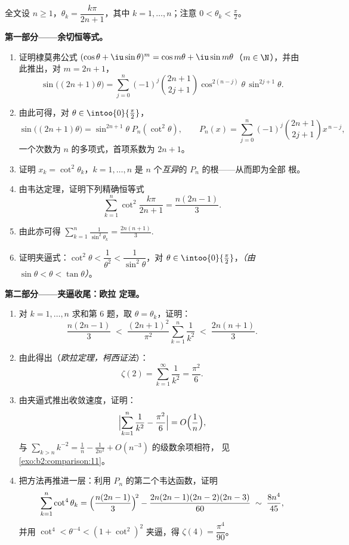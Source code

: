 \begin{problem}[{周末问题——$\zeta(2) = \pi^2/6$ 与
伯特兰全景}]
\label{pb:b2:series:1}
全文设 $n \geq 1$，$\theta_k = \dfrac{k\pi}{2n+1}$，其中 $k
= 1, \dots, n$；注意 $0 < \theta_k < \frac\pi2$。

\medskip
\noindent\textbf{第一部分——余切恒等式。}
\begin{enumerate}
  \item 证明棣莫弗公式 $(\cos\theta +
        \iu\sin\theta)^m = \cos m\theta + \iu\sin m\theta$（$m
        \in \N$），并由此推出，对 $m = 2n + 1$，
        \[
        \sin\bigl((2n{+}1)\theta\bigr) = \sum_{j=0}^{n}
        (-1)^j\binom{2n+1}{2j+1}\cos^{2(n-j)}\theta\,
        \sin^{2j+1}\theta .
        \]
  \item 由此可得，对 $\theta \in \intoo{0}{\frac\pi2}$，
        \[
        \sin\bigl((2n{+}1)\theta\bigr) =
        \sin^{2n+1}\theta\; P_n(\cot^2\theta),
        \qquad
        P_n(x) = \sum_{j=0}^{n}
        (-1)^j\binom{2n+1}{2j+1}x^{\,n-j},
        \]
        一个次数为 $n$ 的多项式，首项系数为 $2n
        + 1$。
  \item 证明 $x_k = \cot^2\theta_k$，$k = 1, \dots, n$ 是
        $n$ 个\emph{互异}的 $P_n$ 的根——从而即为全部
        根。
  \item 由韦达定理，证明下列精确恒等式
        \[
        \sum_{k=1}^{n} \cot^2\frac{k\pi}{2n+1}
        = \frac{n(2n-1)}{3}.
        \]
  \item 由此亦可得 $\displaystyle\sum_{k=1}^{n}
        \frac{1}{\sin^2\theta_k} = \frac{2n(n+1)}{3}$.
  \item 证明夹逼式：$\cot^2\theta < \dfrac1{\theta^2} <
        \dfrac{1}{\sin^2\theta}$，对 $\theta \in
        \intoo{0}{\frac\pi2}$，\emph{（由 $\sin\theta < \theta <
        \tan\theta$）}。
\end{enumerate}

\medskip
\noindent\textbf{第二部分——夹逼收尾：欧拉
定理。}
\begin{enumerate}[resume]
  \item 对 $k = 1, \dots, n$ 求和第 6 题，取 $\theta =
        \theta_k$，证明：
        \[
        \frac{n(2n-1)}{3} \;<\;
        \frac{(2n+1)^2}{\pi^2}\sum_{k=1}^{n}\frac1{k^2}
        \;<\; \frac{2n(n+1)}{3}.
        \]
  \item 由此得出（\emph{欧拉定理，柯西证法}）：
        \[
        \zeta(2) = \sum_{k=1}^{\infty}\frac{1}{k^2} =
        \frac{\pi^2}{6}.
        \]
  \item 由夹逼式推出收敛速度，证明：
        \[
        \Bigl|\sum_{k=1}^{n}\frac1{k^2} - \frac{\pi^2}6\Bigr|
        = O\Bigl(\frac1n\Bigr),
        \]
        与 $\sum_{k>n}k^{-2} =
        \frac1n - \frac{1}{2n^2} + O(n^{-3})$ 的级数余项相符，
        见\cref{exo:b2:comparison:11}。
  \item 把方法再推进一层：利用
        $P_n$ 的第二个韦达函数，证明
        \[
        \sum_{k=1}^{n}\cot^4\theta_k =
        \Bigl(\frac{n(2n-1)}3\Bigr)^{\!2} -
        \frac{2n(2n-1)(2n-2)(2n-3)}{60}
        \;\sim\; \frac{8n^4}{45},
        \]
        并用 $\cot^4 < \theta^{-4} < (1 +
        \cot^2)^2$ 夹逼，得 $\zeta(4) = \dfrac{\pi^4}{90}$。
\end{enumerate}


\end{problem}

